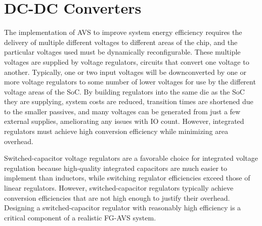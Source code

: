 \documentclass[graybox]{svmult}
\begin{document}
\section{DC-DC Converters}
\label{sec:sc-dcdc}

The implementation of AVS to improve system energy efficiency requires the delivery of multiple different voltages to different areas of the chip, and the particular voltages used must be dynamically reconfigurable.
These multiple voltages are supplied by voltage regulators, circuits that convert one voltage to another.
Typically, one or two input voltages will be downconverted by one or more voltage regulators to some number of lower voltages for use by the different voltage areas of the SoC.
By building regulators into the same die as the SoC they are supplying, system costs are reduced, transition times are shortened due to the smaller passives, and many voltages can be generated from just a few external supplies, ameliorating any issues with IO count.
However, integrated regulators must achieve high conversion efficiency while minimizing area overhead.


Switched-capacitor voltage regulators are a favorable choice for integrated voltage regulation because high-quality integrated capacitors are much easier to implement than inductors, while switching regulator efficiencies exceed those of linear regulators.
However, switched-capacitor regulators typically achieve conversion efficiencies that are not high enough to justify their overhead. 
Designing a switched-capacitor regulator with reasonably high efficiency is a critical component of a realistic FG-AVS system.
\end{document}

